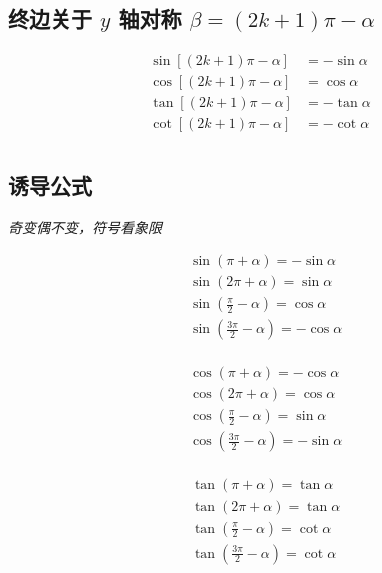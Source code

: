 \documentclass[a4paper, fleqn, fontset = mac]{ctexart}
\newcommand{\diform}{\noindent}
\begin{document}
\begin{multicols}{2}
	\subsection{终边关于 $ y $ 轴对称 $\beta=(2k+1)\pi-\alpha$}
	\diform
	\begin{align*}
	\sin\left[\left(2k+1\right)\pi-\alpha\right]&=-\sin\alpha \\
	\cos\left[\left(2k+1\right)\pi-\alpha\right]&=\cos\alpha \\
	\tan\left[\left(2k+1\right)\pi-\alpha\right]&=-\tan\alpha \\
	\cot\left[\left(2k+1\right)\pi-\alpha\right]&=-\cot\alpha \\
	\end{align*}

	\subsection{诱导公式}
	\textit{奇变偶不变，符号看象限}
	
	\begin{multicols}{2}[\setlength{\columnseprule}{0pt}\setlength{\columnseprule}{0pt}]
	\setlength{\parskip}{-10ex}
		\begin{align*}
		& \sin\left( \pi + \alpha \right) = -\sin\alpha \\
		& \sin\left( 2\pi + \alpha \right) = \sin\alpha \\
		& \sin\left( \frac\pi2 - \alpha \right) = \cos\alpha \\
		& \sin\left( \frac{3\pi}2 - \alpha \right) = -\cos\alpha \\
		\end{align*}
			
		\begin{align*}
		& \cos\left( \pi + \alpha \right) = -\cos\alpha \\
		& \cos\left( 2\pi + \alpha \right) = \cos\alpha \\
		& \cos\left( \frac\pi2 - \alpha \right) = \sin\alpha \\
		& \cos\left( \frac{3\pi}2 - \alpha \right) = -\sin\alpha \\
		\end{align*}
		
		\setlength{\parskip}{-10ex}
		
		\begin{align*}
		& \tan\left( \pi + \alpha \right) = \tan\alpha \\
		& \tan\left( 2\pi + \alpha \right) = \tan\alpha \\
		& \tan\left( \frac\pi2 - \alpha \right) = \cot\alpha \\
		& \tan\left( \frac{3\pi}2 - \alpha \right) = \cot\alpha \\
		\end{align*}
		

\end{multicols}
\end{multicols}
\end{document}
